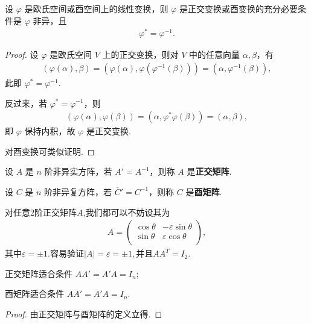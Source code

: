 \documentclass[../../main.tex]{subfiles}
\begin{document}
\begin{theorem}\label{theorem:正交变换或酉变换g关于伴随算子的充要条件}
设 $\varphi$ 是欧氏空间或酉空间上的线性变换，则 $\varphi$ 是正交变换或酉变换的充分必要条件是 $\varphi$ 非异，且
\begin{align*}
\varphi^* = \varphi^{-1}.
\end{align*}
\end{theorem}
\begin{proof}
设 $\varphi$ 是欧氏空间 $V$ 上的正交变换，则对 $V$ 中的任意向量 $\alpha,\beta$，有
\begin{align*}
(\varphi(\alpha),\beta) = (\varphi(\alpha),\varphi(\varphi^{-1}(\beta))) = (\alpha,\varphi^{-1}(\beta)),
\end{align*}
此即 $\varphi^* = \varphi^{-1}$.

反过来，若 $\varphi^* = \varphi^{-1}$，则
\begin{align*}
(\varphi(\alpha),\varphi(\beta)) = (\alpha,\varphi^*\varphi(\beta)) = (\alpha,\beta),
\end{align*}
即 $\varphi$ 保持内积，故 $\varphi$ 是正交变换.

对酉变换可类似证明.

\end{proof}

\begin{definition}[正交矩阵和酉矩阵]
设 $A$ 是 $n$ 阶非异实方阵，若 $A' = A^{-1}$，则称 $A$ 是\textbf{正交矩阵}. 

设 $C$ 是 $n$ 阶非异复方阵，若 $\overline{C}' = C^{-1}$，则称 $C$ 是\textbf{酉矩阵}.
\end{definition}
\begin{remark}
对任意2阶正交矩阵$A$,我们都可以不妨设其为
\begin{align*}
A=\left( \begin{matrix}
\cos \theta&		-\varepsilon \sin \theta\\
\sin \theta&		\varepsilon \cos \theta\\
\end{matrix} \right) ,
\end{align*}
其中$\varepsilon=\pm 1$.容易验证$|A|=\varepsilon =\pm 1,$并且$AA^T=I_2.$
\end{remark}

\begin{theorem}
正交矩阵适合条件 $AA' = A'A = I_n$;

酉矩阵适合条件 $A\overline{A}' = \overline{A}'A = I_n$.
\end{theorem}
\begin{proof}
由正交矩阵与酉矩阵的定义立得.

\end{proof}
\end{document}
